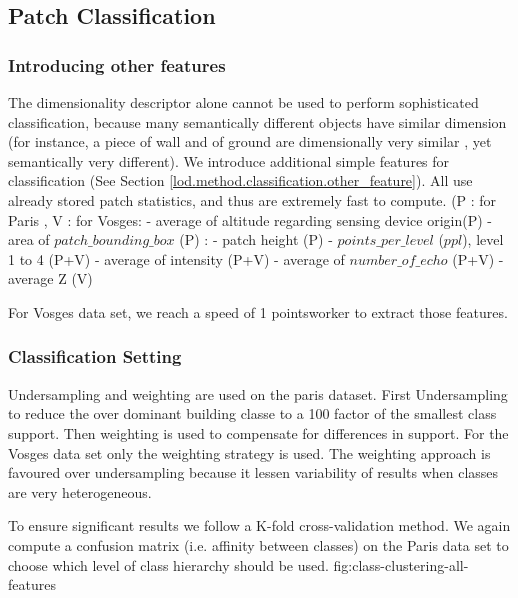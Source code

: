 	\subsection{Patch Classification}
		\label{lod.result.classification}
		 
		\subsubsection{Introducing other features}
		The dimensionality descriptor alone cannot be used to perform sophisticated classification,
		because many semantically different objects have similar dimension 
		(for instance, a piece of wall and of ground are dimensionally very similar
		, yet semantically very different).
		We introduce additional simple features for classification (See Section \ref{lod.method.classification.other_feature}). All use already stored patch statistics, and thus are extremely fast to compute.
		(P : for Paris , V : for Vosges: 
		- average of altitude regarding sensing device origin(P)
		- area of $patch\_bounding\_box$ (P) : 
		- patch height (P)
		- $points\_per\_level$ ($ppl$), level 1 to 4 (P+V)
		- average of intensity (P+V)
		- average of $number\_of\_echo$ (P+V) 
		- average Z (V)
		
		For Vosges data set, we reach a speed of 1 \mega points\per \second \per worker to extract those features.
		\subsubsection{Classification Setting} 
		Undersampling and weighting are used on the paris dataset. First Undersampling to reduce the over dominant building classe to a 100 factor of the smallest class support. Then weighting is used to compensate for differences in support. 
		For the Vosges data set only the weighting strategy is used. 
		The weighting approach is favoured over undersampling because it lessen variability of results when classes are very heterogeneous.
		
		To ensure significant results we follow a K-fold cross-validation method. We again compute a confusion matrix (i.e. affinity between classes) on the Paris data set to choose which level of class hierarchy should be used.
		fig:class-clustering-all-features
		
		
